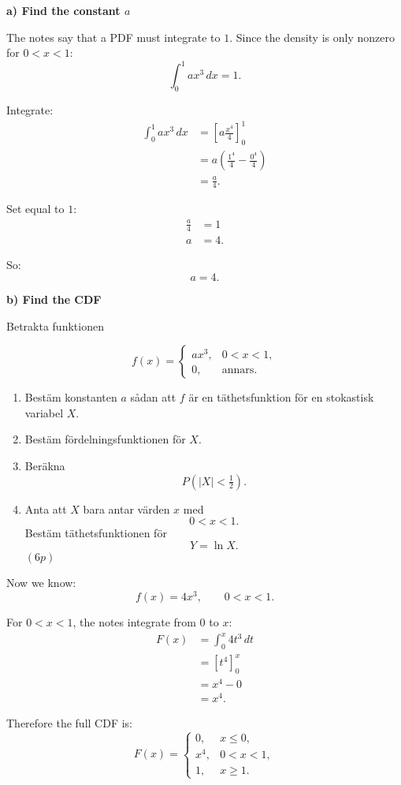 \documentclass[10pt]{article}
\begin{document}
\textbf{a) Find the constant \(a\)}

The notes say that a PDF must integrate to \(1\).
Since the density is only nonzero for \(0<x<1\):
\[
\int_0^1 ax^3\,dx=1.
\]

Integrate:
\begin{align*}
\int_0^1 ax^3\,dx
&=
\left[
a\frac{x^4}{4}
\right]_0^1
\\[2mm]
&=
a\left(
\frac{1^4}{4}
-
\frac{0^4}{4}
\right)
\\[2mm]
&=
\frac{a}{4}.
\end{align*}

Set equal to \(1\):
\begin{align*}
\frac{a}{4}
&=1
\\[2mm]
a&=4.
\end{align*}

So:
\[
a=4.
\]

\textbf{b) Find the CDF}

Betrakta funktionen

\[
f(x)=
\begin{cases}
ax^3,
& 0<x<1,\\
0,
& \text{annars}.
\end{cases}
\]

\begin{enumerate}[label=\alph*)]
\item Bestäm konstanten \(a\) sådan att \(f\) är en
täthetsfunktion för en stokastisk variabel \(X\).

\item Bestäm fördelningsfunktionen för \(X\).

\item Beräkna
\[
P(|X|<\tfrac12).
\]

\item Anta att \(X\) bara antar värden \(x\) med
\[
0<x<1.
\]
Bestäm täthetsfunktionen för
\[
Y=\ln X.
\]
\((6p)\)
\end{enumerate}

Now we know:
\[
f(x)=4x^3,
\qquad 0<x<1.
\]

For \(0<x<1\), the notes integrate from \(0\) to
\(x\):
\begin{align*}
F(x)
&=
\int_0^x 4t^3\,dt
\\[2mm]
&=
\left[
t^4
\right]_0^x
\\[2mm]
&=
x^4-0
\\[2mm]
&=
x^4.
\end{align*}

Therefore the full CDF is:
\[
F(x)=
\begin{cases}
0,
& x\le 0,\\
x^4,
& 0<x<1,\\
1,
& x\ge 1.
\end{cases}
\]
\end{document}
